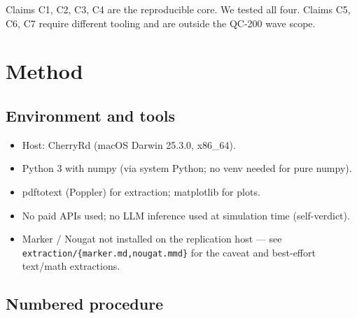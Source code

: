 \documentclass[11pt]{article}
\begin{document}
Claims C1, C2, C3, C4 are the reproducible core.  We tested all four.  Claims C5, C6, C7 require
different tooling and are outside the QC-200 wave scope.

\section{Method}

\subsection{Environment and tools}

\begin{itemize}
    \item Host: CherryRd (macOS Darwin 25.3.0, x86\_64).
    \item Python 3 with numpy (via system Python; no venv needed for pure numpy).
    \item pdftotext (Poppler) for extraction; matplotlib for plots.
    \item No paid APIs used; no LLM inference used at simulation time (self-verdict).
    \item Marker / Nougat not installed on the replication host --- see
    \verb|extraction/{marker.md,nougat.mmd}| for the caveat and best-effort text/math extractions.
\end{itemize}

\subsection{Numbered procedure}
\end{document}
